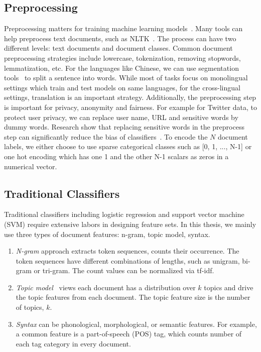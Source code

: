 \subsection{Preprocessing}
Preprocessing matters for training machine learning models~\cite{camacho2018role,huang2019matters}.
Many tools can help preprocess text documents, such as NLTK~\cite{bird2004nltk}.
The process can have two different levels: text documents and document classes.
Common document preprocessing strategies include lowercase, tokenization, removing stopwords, lemmatization, etc.
For the languages like Chinese, we can use segmentation tools~\cite{sun2012jieba} to split a sentence into words.
While most of tasks focus on monolingual settings which train and test models on same languages, for the cross-lingual settings, translation is an important strategy.
Additionally, the preprocessing step is important for privacy, anonymity and fairness. 
For example for Twitter data, to protect user privacy, we can replace user name, URL and sensitive words by dummy words. Research show that replacing sensitive words in the preprocess step can significantly reduce the bias of classifiers~\cite{dixon2018measuring}.
To encode the $N$ document labels, we either choose to use sparse categorical classes such as [0, 1, ..., N-1] or one hot encoding which has one 1 and the other N-1 scalars as zeros in a numerical vector. 


\subsection{Traditional Classifiers}

Traditional classifiers including logistic regression and support vector machine (SVM) require extensive labors in designing feature sets.
In this thesis, we mainly use three types of document features: n-gram, topic model, syntax.

\begin{enumerate}
\item \textit{N-gram} approach extracts token sequences, counts their occurrence. The token sequences have different combinations of lengths, such as unigram, bi-gram or tri-gram. The count values can be normalized via tf-idf.  
\item \textit{Topic model}~\cite{blei2003latent} views each document has a distribution over $k$ topics and drive the topic features from each document. The topic feature size is the number of topics, $k$. 
\item \textit{Syntax} can be phonological, morphological, or semantic features. For example, a common feature is a part-of-speech (POS) tag, which counts number of each tag category in every document. 
\end{enumerate}  


